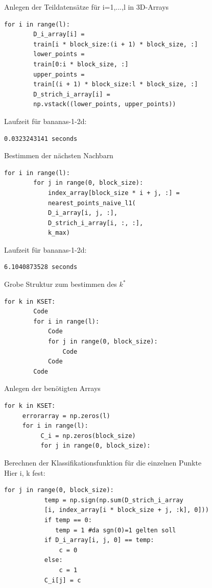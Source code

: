\documentclass{beamer}
\begin{document}
\begin{frame}[fragile]
Anlegen der Teildatensätze für i=1,...,l in 3D-Arrays
\begin{verbatim}
for i in range(l):
        D_i_array[i] = 
        train[i * block_size:(i + 1) * block_size, :]
        lower_points = 
        train[0:i * block_size, :]
        upper_points = 
        train[(i + 1) * block_size:l * block_size, :]
        D_strich_i_array[i] =
        np.vstack((lower_points, upper_points))
\end{verbatim}
Laufzeit für bananas-1-2d:
\begin{verbatim}
0.0323243141 seconds
\end{verbatim}
\end{frame}

\begin{frame}[fragile]
Bestimmen der nächsten Nachbarn
\begin{verbatim}
for i in range(l):
        for j in range(0, block_size):
            index_array[block_size * i + j, :] =
            nearest_points_naive_l1(
            D_i_array[i, j, :],
            D_strich_i_array[i, :, :], 
            k_max)
\end{verbatim}
Laufzeit für bananas-1-2d:
\begin{verbatim}
6.1040873528 seconds
\end{verbatim}
\end{frame}

\begin{frame}[fragile]
Grobe Struktur zum bestimmen des $k^*$
\begin{verbatim}
for k in KSET:
        Code
        for i in range(l):
            Code
            for j in range(0, block_size):
                Code
            Code
        Code
\end{verbatim}
\end{frame}

\begin{frame}[fragile]
Anlegen der benötigten Arrays
\begin{verbatim}
for k in KSET:
     errorarray = np.zeros(l)
     for i in range(l):
          C_i = np.zeros(block_size)
          for j in range(0, block_size):
\end{verbatim}
\end{frame}

\begin{frame}[fragile]
Berechnen der Klassifikationsfunktion für die einzelnen Punkte\\
Hier i, k fest:
\begin{verbatim}
for j in range(0, block_size):
           temp = np.sign(np.sum(D_strich_i_array
           [i, index_array[i * block_size + j, :k], 0]))
           if temp == 0:
              temp = 1 #da sgn(0)=1 gelten soll
           if D_i_array[i, j, 0] == temp:
               c = 0
           else:
               c = 1
           C_i[j] = c
\end{verbatim}
\end{frame}
\end{document}
